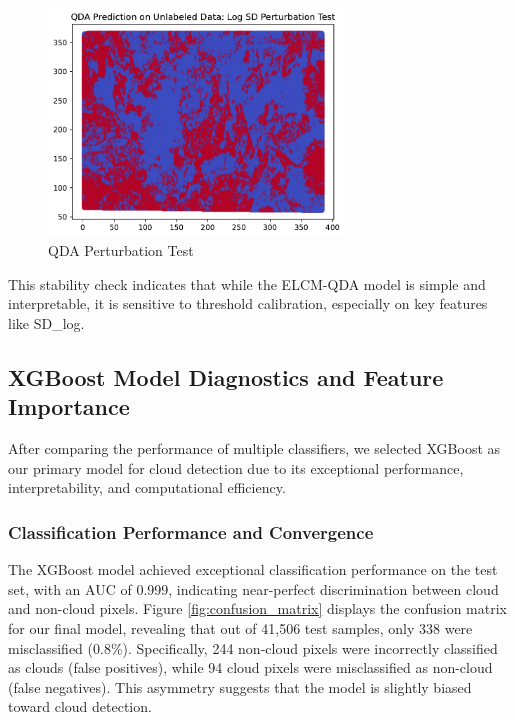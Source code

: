 \documentclass[10pt,letterpaper]{article}
\begin{document}
\begin{figure}[H]
    \centering
    \includegraphics[width=0.7\textwidth]{QDA_perturbed.pdf}
    \caption{QDA Perturbation Test}
    \label{Figure}
\end{figure}

This stability check indicates that while the ELCM-QDA model is simple and interpretable, it is sensitive to threshold calibration, especially on key features like SD\_log.


\subsection{XGBoost Model Diagnostics and Feature Importance}

After comparing the performance of multiple classifiers, we selected XGBoost as our primary model for cloud detection due to its exceptional performance, interpretability, and computational efficiency. 

\subsubsection{Classification Performance and Convergence}

The XGBoost model achieved exceptional classification performance on the test set, with an AUC of 0.999, indicating near-perfect discrimination between cloud and non-cloud pixels. Figure \ref{fig:confusion_matrix} displays the confusion matrix for our final model, revealing that out of 41,506 test samples, only 338 were misclassified (0.8\%). Specifically, 244 non-cloud pixels were incorrectly classified as clouds (false positives), while 94 cloud pixels were misclassified as non-cloud (false negatives). This asymmetry suggests that the model is slightly biased toward cloud detection.
\end{document}
